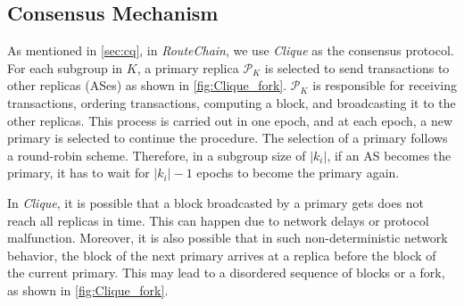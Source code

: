 \documentclass[5p]{elsarticle}
\newcommand{\rc}{{{\em RouteChain}}\xspace}
\newcommand{\eg}{{\em e.g.}\xspace}
\begin{document}

\subsection{Consensus Mechanism}\label{sec:consen}
As mentioned in \textsection\ref{sec:cq}, in \rc, we use {\em Clique} as the consensus protocol. For each subgroup in $K$, a primary replica $\mathcal{P}_{K}$ is selected to send transactions to other replicas (ASes) as shown in \autoref{fig:Clique_fork}. $\mathcal{P}_{K}$ is responsible for receiving transactions, ordering transactions, computing a block, and broadcasting it to the other replicas. This process is carried out in one epoch, and at each epoch, a new primary is selected to continue the procedure. The selection of a primary follows a round-robin scheme. Therefore, in a subgroup size of $|k_{i}|$, if an AS becomes the primary, it has to wait for $|k_{i}|-1$ epochs to become the primary again.  


In {\em Clique}, it is possible that a block broadcasted by a primary gets does not reach all replicas in time. This can happen due to network delays or protocol malfunction. Moreover, it is also possible that in such non-deterministic network behavior, the block of the next primary arrives at a replica before the block of the current primary. This may lead to a disordered sequence of blocks or a fork, as shown in \autoref{fig:Clique_fork}. 
\end{document}
